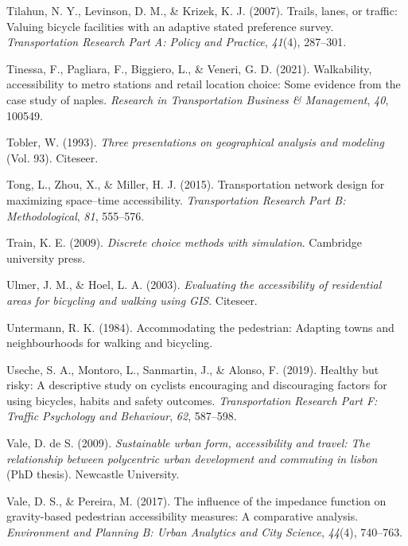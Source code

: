 \documentclass[
11pt, %
oneside, %
english, %
singlespacing, %
]{macthesis} %
\newlength{\cslhangindent}
\newenvironment{CSLReferences}[2] %
 {%
  \setlength{\parindent}{0pt}
  \ifodd #1 \everypar{\setlength{\hangindent}{\cslhangindent}}\ignorespaces\fi
  \ifnum #2 > 0
  \setlength{\parskip}{#2\baselineskip}
  \fi
 }%
 {}
\begin{document}
\begin{CSLReferences}{1}{0}
Tilahun, N. Y., Levinson, D. M., \& Krizek, K. J. (2007). Trails, lanes, or traffic: Valuing bicycle facilities with an adaptive stated preference survey. \emph{Transportation Research Part A: Policy and Practice}, \emph{41}(4), 287--301.

Tinessa, F., Pagliara, F., Biggiero, L., \& Veneri, G. D. (2021). Walkability, accessibility to metro stations and retail location choice: Some evidence from the case study of naples. \emph{Research in Transportation Business \& Management}, \emph{40}, 100549.

Tobler, W. (1993). \emph{Three presentations on geographical analysis and modeling} (Vol. 93). Citeseer.

Tong, L., Zhou, X., \& Miller, H. J. (2015). Transportation network design for maximizing space--time accessibility. \emph{Transportation Research Part B: Methodological}, \emph{81}, 555--576.

Train, K. E. (2009). \emph{Discrete choice methods with simulation}. Cambridge university press.

Ulmer, J. M., \& Hoel, L. A. (2003). \emph{Evaluating the accessibility of residential areas for bicycling and walking using GIS}. Citeseer.

Untermann, R. K. (1984). Accommodating the pedestrian: Adapting towns and neighbourhoods for walking and bicycling.

Useche, S. A., Montoro, L., Sanmartin, J., \& Alonso, F. (2019). Healthy but risky: A descriptive study on cyclists encouraging and discouraging factors for using bicycles, habits and safety outcomes. \emph{Transportation Research Part F: Traffic Psychology and Behaviour}, \emph{62}, 587--598.

Vale, D. de S. (2009). \emph{Sustainable urban form, accessibility and travel: The relationship between polycentric urban development and commuting in lisbon} (PhD thesis). Newcastle University.

Vale, D. S., \& Pereira, M. (2017). The influence of the impedance function on gravity-based pedestrian accessibility measures: A comparative analysis. \emph{Environment and Planning B: Urban Analytics and City Science}, \emph{44}(4), 740--763.


\end{CSLReferences}
\end{document}
